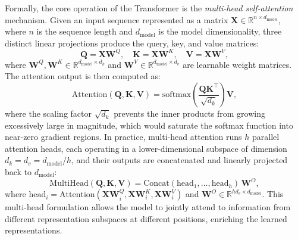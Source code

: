 Formally, the core operation of the Transformer is the \emph{multi-head self-attention} mechanism. Given an input sequence represented as a matrix $\mathbf{X} \in \mathbb{R}^{n \times d_{\text{model}}}$, where $n$ is the sequence length and $d_{\text{model}}$ is the model dimensionality, three distinct linear projections produce the query, key, and value matrices:
\begin{equation}
    \mathbf{Q} = \mathbf{X}\mathbf{W}^Q, \quad
    \mathbf{K} = \mathbf{X}\mathbf{W}^K, \quad
    \mathbf{V} = \mathbf{X}\mathbf{W}^V,
    \label{eq:qkv}
\end{equation}
where $\mathbf{W}^Q, \mathbf{W}^K \in \mathbb{R}^{d_{\text{model}} \times d_k}$ and $\mathbf{W}^V \in \mathbb{R}^{d_{\text{model}} \times d_v}$ are learnable weight matrices. The attention output is then computed as:
\begin{equation}
    \text{Attention}(\mathbf{Q}, \mathbf{K}, \mathbf{V}) = \text{softmax}\!\left(\frac{\mathbf{Q}\mathbf{K}^\top}{\sqrt{d_k}}\right)\mathbf{V},
    \label{eq:attention}
\end{equation}
where the scaling factor $\sqrt{d_k}$ prevents the inner products from growing excessively large in magnitude, which would saturate the softmax function into near-zero gradient regions. In practice, multi-head attention runs $h$ parallel attention heads, each operating in a lower-dimensional subspace of dimension $d_k = d_v = d_{\text{model}} / h$, and their outputs are concatenated and linearly projected back to $d_{\text{model}}$:
\begin{equation}
    \text{MultiHead}(\mathbf{Q}, \mathbf{K}, \mathbf{V}) =
    \text{Concat}(\text{head}_1, \ldots, \text{head}_h)\,\mathbf{W}^O,
    \label{eq:multihead}
\end{equation}
where $\text{head}_i = \text{Attention}(\mathbf{X}\mathbf{W}_i^Q, \mathbf{X}\mathbf{W}_i^K, \mathbf{X}\mathbf{W}_i^V)$ and $\mathbf{W}^O \in \mathbb{R}^{h d_v \times d_{\text{model}}}$. This multi-head formulation allows the model to jointly attend to information from different representation subspaces at different positions, enriching the learned representations.

